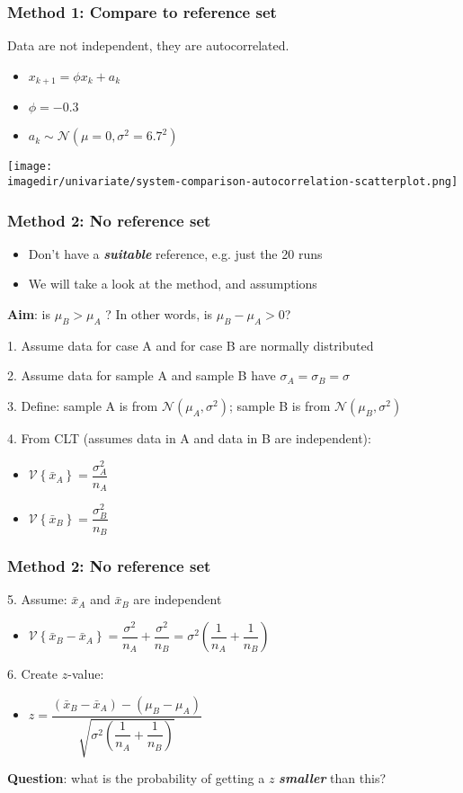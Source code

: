 \begin{frame}\frametitle{Method 1: Compare to reference set}

	Data are not independent, they are autocorrelated.
	\begin{itemize}
		\item $x_{k+1} = \phi x_{k} + a_k$
		\item $\phi = -0.3$
		\item $a_k \sim \mathcal{N}\left(\mu=0, \sigma^2=6.7^2\right)$
	\end{itemize}

	\texttt{[image: \\imagedir/univariate/system-comparison-autocorrelation-scatterplot.png]}
\end{frame}

\begin{frame}\frametitle{Method 2: No reference set}
	\begin{itemize}
		\item Don't have a \textbf{\emph{suitable}} reference, e.g. just the 20 runs
		\item We will take a look at the method, and assumptions
	\end{itemize}

	\textbf{Aim}: is $\mu_B > \mu_A$ ? In other words, is $\mu_B - \mu_A > 0$?

	1. Assume data for case A and for case B are normally distributed

	2. Assume data for sample A and sample B have $\sigma_A = \sigma_B = \sigma$

	3. Define: sample A is from $\mathcal{N}\left(\mu_A, \sigma^2\right)$; sample B is from $\mathcal{N}\left(\mu_B, \sigma^2\right)$

	4. From CLT (assumes data in A and data in B are independent):
	\begin{itemize}
		\item $\mathcal{V}\left\{\bar{x}_A\right\} = \dfrac{\sigma^2_A}{n_A}$
		\item $\mathcal{V}\left\{\bar{x}_B\right\} = \dfrac{\sigma^2_B}{n_B}$
	\end{itemize}
\end{frame}

\begin{frame}\frametitle{Method 2: No reference set}

	5. Assume: $\bar{x}_A$ and $\bar{x}_B$ are independent
	\begin{itemize}
		\item $\mathcal{V}\left\{\bar{x}_B - \bar{x}_A\right\} = \dfrac{\sigma^2}{n_A} + \dfrac{\sigma^2}{n_B} = \sigma^2 \left(\dfrac{1}{n_A} + \dfrac{1}{n_B}\right)$
	\end{itemize}

	6. Create $z$-value:
	\begin{itemize}
		\item $z = \dfrac{(\bar{x}_B - \bar{x}_A) - (\mu_B - \mu_A)}{\sqrt{\sigma^2 \left(\dfrac{1}{n_A} + \dfrac{1}{n_B}\right)}}$
	\end{itemize}

	\textbf{Question}: what is the probability of getting a $z$ \textbf{\emph{smaller}} than this?
\end{frame}

